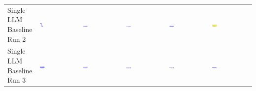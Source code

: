 \begin{table}
\begin{tabularx}{\textwidth}{@{}XXXXXX@{}}
    \makecell{Single LLM \\ Baseline \\ Run 2} & \includegraphics[width=0.13\textwidth]{./run_2/png/gpt-4o_results/Arrow.png} & \includegraphics[width=0.13\textwidth]{./run_2/png/o1-preview_results/Arrow.png} & \includegraphics[width=0.13\textwidth]{./run_2/png/claude-3-5-sonnet-20240620_results/Arrow.png} & \includegraphics[width=0.13\textwidth]{./run_2/png/watsonx_meta-llama_llama-3-1-70b-instruct_results/Arrow.png} & \includegraphics[width=0.13\textwidth]{./run_2/png/watsonx_meta-llama_llama-3-405b-instruct_results/Arrow.png} \\
    \makecell{Single LLM \\ Baseline \\ Run 3} & \includegraphics[width=0.13\textwidth]{./run_3/png/gpt-4o_results/Arrow.png} & \includegraphics[width=0.13\textwidth]{./run_3/png/o1-preview_results/Arrow.png} & \includegraphics[width=0.13\textwidth]{./run_3/png/claude-3-5-sonnet-20240620_results/Arrow.png} & \includegraphics[width=0.13\textwidth]{./run_3/png/watsonx_meta-llama_llama-3-1-70b-instruct_results/Arrow.png} & \includegraphics[width=0.13\textwidth]{./run_3/png/watsonx_meta-llama_llama-3-405b-instruct_results/Arrow.png} \\

\end{tabularx}
\end{table}
